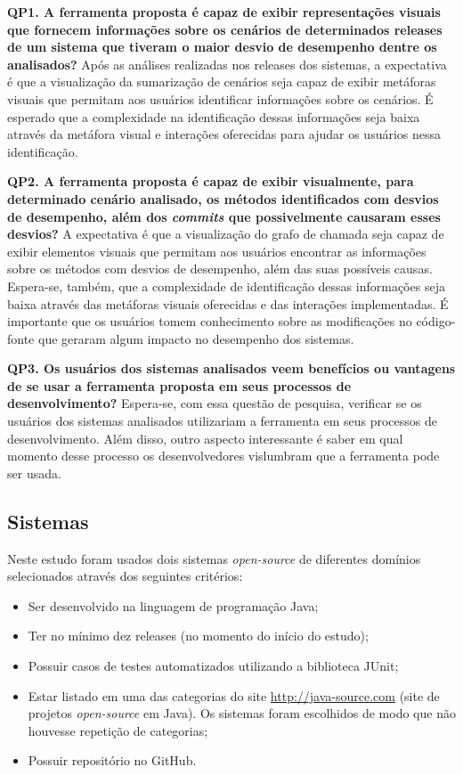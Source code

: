 \textbf{QP1. A ferramenta proposta é capaz de exibir representações visuais que fornecem informações sobre os cenários de determinados releases de um sistema que tiveram o maior desvio de desempenho dentre os analisados?} Após as análises realizadas nos releases dos sistemas, a expectativa é que a visualização da sumarização de cenários seja capaz de exibir metáforas visuais que permitam aos usuários identificar informações sobre os cenários. É esperado que a complexidade na identificação dessas informações seja baixa através da metáfora visual e interações oferecidas para ajudar os usuários nessa identificação.

\textbf{QP2. A ferramenta proposta é capaz de exibir visualmente, para determinado cenário analisado, os métodos identificados com desvios de desempenho, além dos \textit{commits} que possivelmente causaram esses desvios?} A expectativa é que a visualização do grafo de chamada seja capaz de exibir elementos visuais que permitam aos usuários encontrar as informações sobre os métodos com desvios de desempenho, além das suas possíveis causas. Espera-se, também, que a complexidade de identificação dessas informações seja baixa através das metáforas visuais oferecidas e das interações implementadas. É importante que os usuários tomem conhecimento sobre as modificações no código-fonte que geraram algum impacto no desempenho dos sistemas.

\textbf{QP3. Os usuários dos sistemas analisados veem benefícios ou vantagens de se usar a ferramenta proposta em seus processos de desenvolvimento?} Espera-se, com essa questão de pesquisa, verificar se os usuários dos sistemas analisados utilizariam a ferramenta em seus processos de desenvolvimento. Além disso, outro aspecto interessante é saber em qual momento desse processo os desenvolvedores vislumbram que a ferramenta pode ser usada.

\subsection{Sistemas} \label{subsec:avaliacao-sistemas}

Neste estudo foram usados dois sistemas \textit{open-source} de diferentes domínios selecionados através dos seguintes critérios:
\begin{itemize}
  \item Ser desenvolvido na linguagem de programação Java;
  \item Ter no mínimo dez releases (no momento do início do estudo);
  \item Possuir casos de testes automatizados utilizando a biblioteca JUnit;
  \item Estar listado em uma das categorias do site \href{http://java-source.com}{http://java-source.com} (site de projetos \textit{open-source} em Java). Os sistemas foram escolhidos de modo que não houvesse repetição de categorias;
  \item Possuir repositório no GitHub.
\end{itemize}

